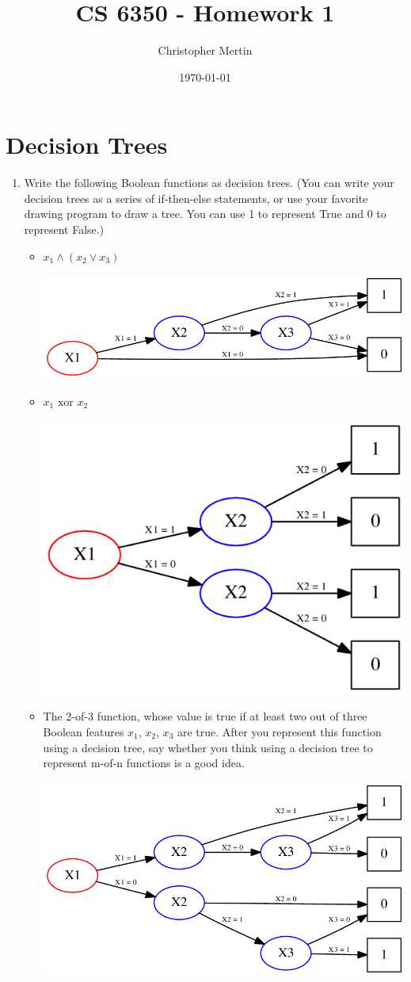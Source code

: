 \documentclass[listings, listings-bw, listings-color, listings-sv]{article}
\author{Christopher Mertin}
\date{\today}
\title{CS 6350 - Homework 1}
\begin{document}
\maketitle

\section{Decision Trees}
\label{sec-1}
\begin{enumerate}
\item Write  the  following  Boolean  functions  as  decision  trees.   (You  can  write your decision trees as a series of if-then-else statements, or use your favorite drawing program to draw a tree.  You can use 1 to represent True and 0 to represent False.)
\begin{itemize}
\item $x_{1} \wedge (x_{2}\vee x_{3})$

\includegraphics[height=3 cm]{./images/1a-LR.png}

\item $x_{1} \text{ xor } x_{2}$

\includegraphics[height=5 cm]{./images/1b-LR.png}

\item The 2-of-3 function, whose value is true if at least two out of three Boolean features $x_{1}$, $x_{2}$, $x_{3}$ are true. After you represent this function using a decision tree, say whether you think using a decision tree to represent m-of-n functions is a good idea.

\includegraphics[height=5 cm]{./images/1c-LR.png}


\end{itemize}
\end{enumerate}
\end{document}
